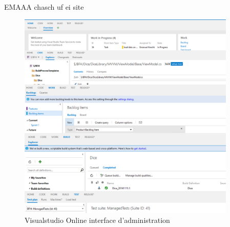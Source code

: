 EMAAA chasch uf ei site
\begin{figure}[H]
	\centering
		\includegraphics[height=10cm]{bilder/vso}
	\caption{Visualstudio Online interface d'administration}
	\label{fig:vsogui}
\end{figure}

